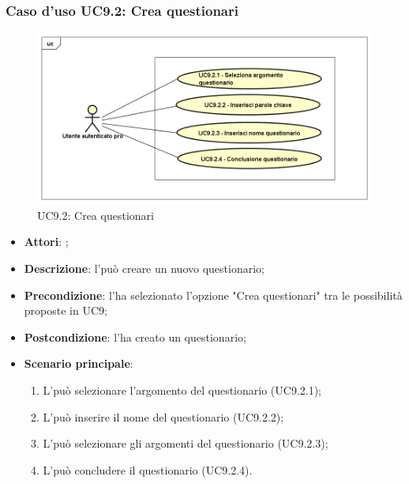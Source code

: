 	\subsubsection{Caso d'uso UC9.2: Crea questionari}
	\label{UC9.2}
	\begin{figure}[h]
		\centering
	\includegraphics[scale=0.5,keepaspectratio]{UML/UC9_2.png}
		\caption{UC9.2: Crea questionari}
	\end{figure}
	\FloatBarrier
	\begin{itemize}
		\item \textbf{Attori}: \uaupro;
		\item \textbf{Descrizione}: l'\uaupro può creare un nuovo questionario; 
		\item \textbf{Precondizione}: l'\uaupro ha selezionato l'opzione "Crea questionari" tra le possibilità proposte in UC9;
		\item \textbf{Postcondizione}: l'\uaupro ha creato un questionario;
		\item \textbf{Scenario principale}:
			\begin{enumerate}
				\item L'\uaupro può selezionare l'argomento del questionario (UC9.2.1);
				\item L'\uaupro può inserire il nome del questionario (UC9.2.2);
				\item L'\uaupro può selezionare gli argomenti del questionario (UC9.2.3);
				\item L'\uaupro può concludere il questionario (UC9.2.4).
			\end{enumerate}
		\end{itemize}
	
